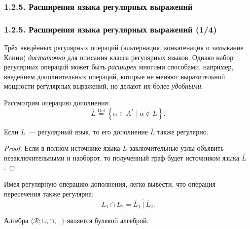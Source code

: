 \documentclass[mathserif,12pt,aspectratio=169]{beamer}
\def\emразделенной{\em разделенной}
\def\em#1{\it\color{blue}#1}
\def\Set#1#2{\left\{ #1 \mid #2 \right\}}
\def\Def{\stackrel{\text{Def}}{=}}
\let\cal\mathcal
\begin{document}
\subsubsection{1.2.5. Расширения языка регулярных выражений}
\label{1.2.5.}

\begin{frame}
\frametitle{1.2.5. Расширения языка регулярных выражений (1/4)}

Трёх введённых регулярных операций
(альтернация, конкатенация и замыкание Клини) {\em достаточно} 
для описания класса регулярных языков.
Однако набор регулярных операций может быть {\em расширен} многими способами,
например, введением дополнительных операций, которые не меняют
выразительной мощности регулярных выражений, но делают их более
{\em удобными}.

\smallskip
Рассмотрим операцию дополнения:
$$\overline{L}\Def
\Set{\alpha\in A^*}{\alpha\not\in L}.$$

\begin{theorem}
Если $L$~--- регулярный язык, то
его дополнение $\overline{L}$ также регулярно.
\end{theorem}
\begin{proof}
Если в полном
источнике языка $L$ заключительные узлы
объявить незаключительными и наоборот, то полученный граф будет
источником языка $\overline{L}$.
\end{proof}

\smallskip
Имея регулярную операцию дополнения, легко
вывести, что операция пересечения также регулярна:
$$
L_1\cap L_2 =
\overline{\overline{L}_1~|~\overline{L}_2}.
$$

\begin{remark}
Алгебра $\langle \cal{R}; \cup, \cap, \overline{\phantom{L}}\rangle$ является булевой алгеброй. 
\end{remark}

\end{frame}
\end{document}
